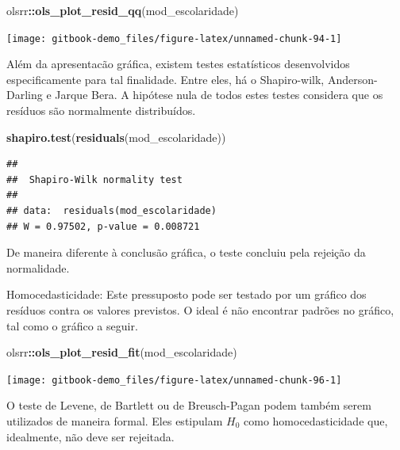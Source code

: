 \documentclass[
]{book}
\newenvironment{Shaded}{\begin{snugshade}}{\end{snugshade}}
\newcommand{\KeywordTok}[1]{\textcolor[rgb]{0.13,0.29,0.53}{\textbf{#1}}}
\newcommand{\NormalTok}[1]{#1}
\newcommand{\OperatorTok}[1]{\textcolor[rgb]{0.81,0.36,0.00}{\textbf{#1}}}
\begin{document}
\begin{Shaded}
\begin{Highlighting}[]
\NormalTok{olsrr}\OperatorTok{::}\KeywordTok{ols_plot_resid_qq}\NormalTok{(mod_escolaridade)}
\end{Highlighting}
\end{Shaded}

\begin{center}\texttt{[image: gitbook-demo\_files/figure-latex/unnamed-chunk-94-1]} \end{center}

Além da apresentacão gráfica, existem testes estatísticos desenvolvidos especificamente para tal finalidade. Entre eles, há o Shapiro-wilk, Anderson-Darling e Jarque Bera. A hipótese nula de todos estes testes considera que os resíduos são normalmente distribuídos.

\begin{Shaded}
\begin{Highlighting}[]
\KeywordTok{shapiro.test}\NormalTok{(}\KeywordTok{residuals}\NormalTok{(mod_escolaridade))}
\end{Highlighting}
\end{Shaded}

\begin{verbatim}
## 
##  Shapiro-Wilk normality test
## 
## data:  residuals(mod_escolaridade)
## W = 0.97502, p-value = 0.008721
\end{verbatim}

De maneira diferente à conclusão gráfica, o teste concluiu pela rejeição da normalidade.

Homocedasticidade: Este pressuposto pode ser testado por um gráfico dos resíduos contra os valores previstos. O ideal é não encontrar padrões no gráfico, tal como o gráfico a seguir.

\begin{Shaded}
\begin{Highlighting}[]
\NormalTok{olsrr}\OperatorTok{::}\KeywordTok{ols_plot_resid_fit}\NormalTok{(mod_escolaridade)}
\end{Highlighting}
\end{Shaded}

\begin{center}\texttt{[image: gitbook-demo\_files/figure-latex/unnamed-chunk-96-1]} \end{center}

O teste de Levene, de Bartlett ou de Breusch-Pagan podem também serem utilizados de maneira formal. Eles estipulam \(H_0\) como homocedasticidade que, idealmente, não deve ser rejeitada.
\end{document}
